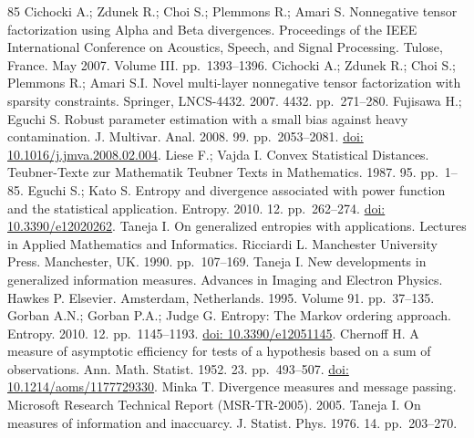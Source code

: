 \begin{thebibliography}{85}
\hypertarget{B33-entropy-12-01532}{} Cichocki A.; Zdunek R.; Choi S.; Plemmons R.; Amari S. Nonnegative tensor factorization using Alpha and Beta divergences. Proceedings of the IEEE International Conference on Acoustics, Speech, and Signal Processing. Tulose, France. May 2007. Volume III. pp.~1393--1396.
\hypertarget{B34-entropy-12-01532}{} Cichocki A.; Zdunek R.; Choi S.; Plemmons R.; Amari S.I. Novel multi-layer nonnegative tensor factorization with sparsity constraints. Springer, LNCS-4432. 2007. 4432. pp.~271--280.
\hypertarget{B35-entropy-12-01532}{} Fujisawa H.; Eguchi S. Robust parameter estimation with a small bias against heavy contamination. J. Multivar. Anal. 2008. 99. pp.~2053--2081. \href{https://doi.org/10.1016/j.jmva.2008.02.004}{doi: 10.1016/j.jmva.2008.02.004}.
\hypertarget{B36-entropy-12-01532}{} Liese F.; Vajda I. Convex Statistical Distances. Teubner-Texte zur Mathematik Teubner Texts in Mathematics. 1987. 95. pp.~1--85.
\hypertarget{B37-entropy-12-01532}{} Eguchi S.; Kato S. Entropy and divergence associated with power function and the statistical application. Entropy. 2010. 12. pp.~262--274. \href{https://doi.org/10.3390/e12020262}{doi: 10.3390/e12020262}.
\hypertarget{B38-entropy-12-01532}{} Taneja I. On generalized entropies with applications. Lectures in Applied Mathematics and Informatics. Ricciardi L. Manchester University Press. Manchester, UK. 1990. pp.~107--169.
\hypertarget{B39-entropy-12-01532}{} Taneja I. New developments in generalized information measures. Advances in Imaging and Electron Physics. Hawkes P. Elsevier. Amsterdam, Netherlands. 1995. Volume 91. pp.~37--135.
\hypertarget{B40-entropy-12-01532}{} Gorban A.N.; Gorban P.A.; Judge G. Entropy: The Markov ordering approach. Entropy. 2010. 12. pp.~1145--1193. \href{https://doi.org/10.3390/e12051145}{doi: 10.3390/e12051145}.
\hypertarget{B41-entropy-12-01532}{} Chernoff H. A measure of asymptotic efficiency for tests of a hypothesis based on a sum of observations. Ann. Math. Statist. 1952. 23. pp.~493--507. \href{https://doi.org/10.1214/aoms/1177729330}{doi: 10.1214/aoms/1177729330}.
\hypertarget{B42-entropy-12-01532}{} Minka T. Divergence measures and message passing. Microsoft Research Technical Report (MSR-TR-2005). 2005.
\hypertarget{B43-entropy-12-01532}{} Taneja I. On measures of information and inaccuarcy. J. Statist. Phys. 1976. 14. pp.~203--270.

\end{thebibliography}
